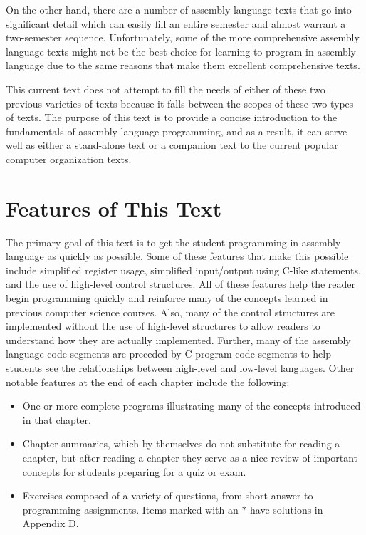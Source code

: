 \documentclass[10pt]{article}
\begin{document}
On the other hand, there are a number of assembly language texts that go into significant detail which can easily fill an entire semester and almost warrant a two-semester sequence. Unfortunately, some of the more comprehensive assembly language texts might not be the best choice for learning to program in assembly language due to the same reasons that make them excellent comprehensive texts.

This current text does not attempt to fill the needs of either of these two previous varieties of texts because it falls between the scopes of these two types of texts. The purpose of this text is to provide a concise introduction to the fundamentals of assembly language programming, and as a result, it can serve well as either a stand-alone text or a companion text to the current popular computer organization texts.

\section*{Features of This Text}
The primary goal of this text is to get the student programming in assembly language as quickly as possible. Some of these features that make this possible include simplified register usage, simplified input/output using C-like statements, and the use of high-level control structures. All of these features help the reader begin programming quickly and reinforce many of the concepts learned in previous computer science courses. Also, many of the control structures are implemented without the use of high-level structures to allow readers to understand how they are actually implemented. Further, many of the assembly language code segments are preceded by C program code segments to help students see the relationships between high-level and low-level languages. Other notable features at the end of each chapter include the following:

\begin{itemize}
  \item One or more complete programs illustrating many of the concepts introduced in that chapter.
  \item Chapter summaries, which by themselves do not substitute for reading a chapter, but after reading a chapter they serve as a nice review of important concepts for students preparing for a quiz or exam.
  \item Exercises composed of a variety of questions, from short answer to programming assignments. Items marked with an $*$ have solutions in Appendix D.
\end{itemize}
\end{document}
